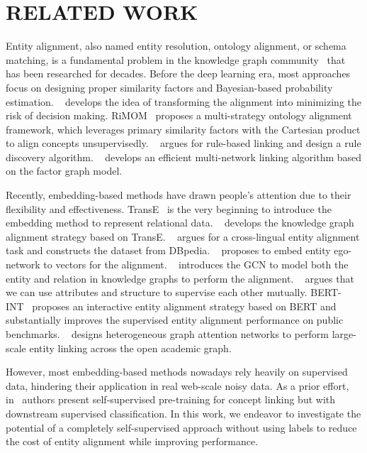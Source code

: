 \section{RELATED WORK}
Entity alignment, also named entity resolution, ontology alignment, or schema matching, is a fundamental problem in the knowledge graph community~\cite{zeng2021comprehensive} that has been researched for decades. Before the deep learning era, most approaches focus on designing proper similarity factors and Bayesian-based probability estimation. ~\cite{tang2006using} develops the idea of transforming the alignment into minimizing the risk of decision making. RiMOM~\cite{li2008rimom} proposes a multi-strategy ontology alignment framework, which leverages primary similarity factors with the Cartesian product to align concepts unsupervisedly. ~\cite{li2014rule} argues for rule-based linking and design a rule discovery algorithm. ~\cite{zhang2015cosnet} develops an efficient multi-network linking algorithm based on the factor graph model.

Recently, embedding-based methods have drawn people's attention due to their flexibility and effectiveness. TransE~\cite{bordes2013translating} is the very beginning to introduce the embedding method to represent relational data. ~\cite{MTransE} develops the knowledge graph alignment strategy based on TransE. ~\cite{JAPE} argues for a cross-lingual entity alignment task and constructs the dataset from DBpedia. ~\cite{zhang2018mego2vec} proposes to embed entity ego-network to vectors for the alignment. ~\cite{GCN-Align} introduces the GCN to model both the entity and relation in knowledge graphs to perform the alignment. ~\cite{trisedya2019entity} argues that we can use attributes and structure to supervise each other mutually. BERT-INT~\cite{tang2019bert-int} proposes an interactive entity alignment strategy based on BERT and substantially improves the supervised entity alignment performance on public benchmarks. ~\cite{zhang2019oag} designs heterogeneous graph attention networks to perform large-scale entity linking across the open academic graph.

However, most embedding-based methods nowadays rely heavily on supervised data, hindering their application in real web-scale noisy data. As a prior effort, in~\cite{liu2021oag_know} authors present self-supervised pre-training for concept linking but with downstream supervised classification. In this work, we endeavor to investigate the potential of a completely self-supervised approach without using labels to reduce the cost of entity alignment while improving performance.

